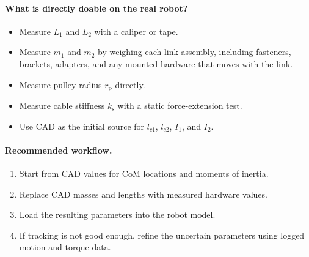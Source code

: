 \documentclass[11pt,a4paper]{article}
\newcommand{\rp}{r_{\mathrm{p}}}
\newcommand{\ks}{k_{\mathrm{s}}}
\begin{document}
\paragraph{What is directly doable on the real robot?}
\begin{itemize}[leftmargin=2em]
  \item Measure $L_1$ and $L_2$ with a caliper or tape.
  \item Measure $m_1$ and $m_2$ by weighing each link assembly, including
        fasteners, brackets, adapters, and any mounted hardware that moves with
        the link.
  \item Measure pulley radius $\rp$ directly.
  \item Measure cable stiffness $\ks$ with a static force-extension test.
  \item Use CAD as the initial source for $l_{c1}$, $l_{c2}$, $I_1$, and $I_2$.
\end{itemize}

\paragraph{Recommended workflow.}
\begin{enumerate}[leftmargin=2em]
  \item Start from CAD values for CoM locations and moments of inertia.
  \item Replace CAD masses and lengths with measured hardware values.
  \item Load the resulting parameters into the robot model.
  \item If tracking is not good enough, refine the uncertain parameters using
        logged motion and torque data.
\end{enumerate}
\end{document}
